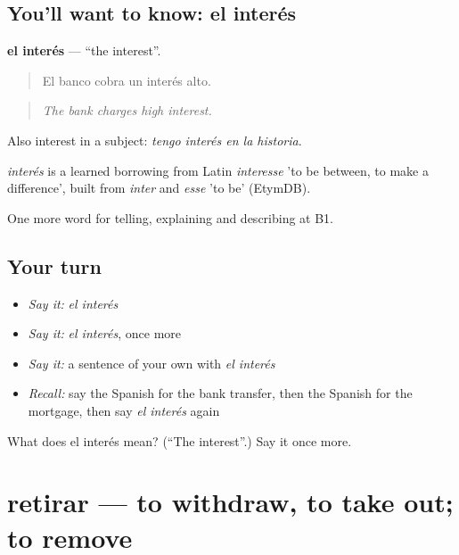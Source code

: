 \subsection*{You'll want to know: el interés}
\textbf{el interés} — \textquotedblleft{}the interest\textquotedblright{}.

\begin{quote}
El banco cobra un interés alto.
\end{quote}

\begin{quote}
\emph{The bank charges high interest.}
\end{quote}

Also interest in a subject: \emph{tengo interés en la historia}.

\begin{cousinweb}
\emph{interés} is a learned borrowing from Latin \emph{interesse} 'to be between, to make a difference', built from \emph{inter} and \emph{esse} 'to be' (EtymDB).
\end{cousinweb}

\begin{grammarlens}[title={What you've built}]
One more word for telling, explaining and describing at B1.
\end{grammarlens}

\subsection*{Your turn}
\begin{itemize}
\raggedright
  \item \emph{Say it:} \emph{el interés}
  \item \emph{Say it:} \emph{el interés}, once more
  \item \emph{Say it:} a sentence of your own with \emph{el interés}
  \item \emph{Recall:} say the Spanish for the bank transfer, then the Spanish for the mortgage, then say \emph{el interés} again
\end{itemize}

\begin{tcolorbox}[breakable,colback=teal!4,colframe=teal!35!black,title={Before you move on}]
What does el interés mean? (\textquotedblleft{}The interest\textquotedblright{}.) Say it once more.
\end{tcolorbox}
\section[retirar]{retirar — to withdraw, to take out; to remove}

